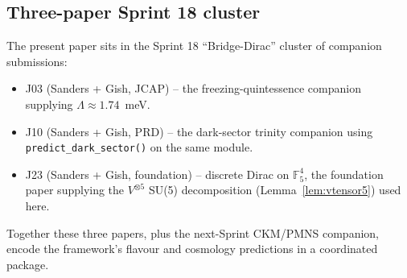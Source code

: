 \documentclass[11pt,reqno]{amsart}
\theoremstyle{plain}
\theoremstyle{definition}
\theoremstyle{remark}
\newcommand{\F}{\mathbb{F}}
\begin{document}
\subsection{Three-paper Sprint 18 cluster}
The present paper sits in the Sprint 18 ``Bridge-Dirac'' cluster
of companion submissions:
\begin{itemize}\setlength\itemsep{0pt}
\item J03 (Sanders + Gish, JCAP) -- the freezing-quintessence
companion supplying $\Lambda \approx 1.74$~meV.
\item J10 (Sanders + Gish, PRD) -- the dark-sector trinity
companion using \texttt{predict\_dark\_sector()} on the same
module.
\item J23 (Sanders + Gish, foundation) -- discrete Dirac on
$\F_{5}^{4}$, the foundation paper supplying the $V^{\otimes 5}$
SU(5) decomposition (Lemma~\ref{lem:vtensor5}) used here.
\end{itemize}
Together these three papers, plus the next-Sprint CKM/PMNS
companion, encode the framework's flavour and cosmology
predictions in a coordinated package.
\end{document}
